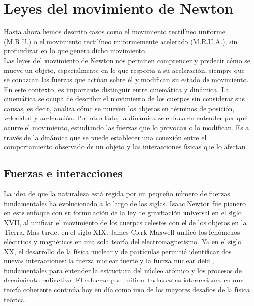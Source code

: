 \setcounter{page}{49}
\setcounter{chapter}{5}

\chapter{Leyes del movimiento de Newton}
\label{cap:cap6}
\vspace{-15ex}


\raggedright

Hasta ahora hemos descrito casos como el movimiento rectilíneo uniforme (M.R.U.) o el movimiento rectilíneo uniformemente acelerado (M.R.U.A.), sin profundizar en lo que genera dicho movimiento. \\[.35cm]

Las leyes del movimiento de Newton nos permiten comprender y predecir cómo se mueve un objeto, especialmente en lo que respecta a su aceleración, siempre que se conozcan las fuerzas que actúan sobre él y modifican su estado de movimiento.\\[.35cm]

En este contexto, es importante distinguir entre cinemática y dinámica. La cinemática se ocupa de describir el movimiento de los cuerpos sin considerar sus causas, es decir, analiza cómo se mueven los objetos en términos de posición, velocidad y aceleración. Por otro lado, la dinámica se enfoca en entender por qué ocurre el movimiento, estudiando las fuerzas que lo provocan o lo modifican. Es a través de la dinámica que se puede establecer una conexión entre el comportamiento observado de un objeto y las interacciones físicas que lo afectan

\section{Fuerzas e interacciones}
La idea de que la naturaleza está regida por un pequeño número de fuerzas fundamentales ha evolucionado a lo largo de los siglos. Isaac Newton fue pionero en este enfoque con su formulación de la ley de gravitación universal en el siglo XVII, al unificar el movimiento de los cuerpos celestes con el de los objetos en la Tierra. Más tarde, en el siglo XIX, James Clerk Maxwell unificó los fenómenos eléctricos y magnéticos en una sola teoría del electromagnetismo. Ya en el siglo XX, el desarrollo de la física nuclear y de partículas permitió identificar dos nuevas interacciones: la fuerza nuclear fuerte y la fuerza nuclear débil, fundamentales para entender la estructura del núcleo atómico y los procesos de decaimiento radiactivo. El esfuerzo por unificar todas estas interacciones en una teoría coherente continúa hoy en día como uno de los mayores desafíos de la física teórica.\\[.35cm  ]

